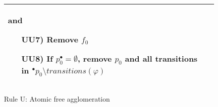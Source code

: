 \begin{figure}
\begin{adjustbox}{center}
\begin{tabular}{|p{70mm}|p{70mm}|}
\begin{itemize}[leftmargin=10mm]
        \end{itemize}
        and
        \begin{itemize}[leftmargin=10mm]
            \item[UU7)] Remove $f_0$
            \item[UU8)] If $p_0^\bullet = \emptyset$, remove $p_0$ and all transitions in ${}^\bullet p_0\setminus transitions(\varphi)$
        \end{itemize} \\ \hline
        \end{tabular}
    \end{adjustbox}
    \caption{Rule U: Atomic free agglomeration}
    \label{fig:rule_u_cpn}
\end{figure}
